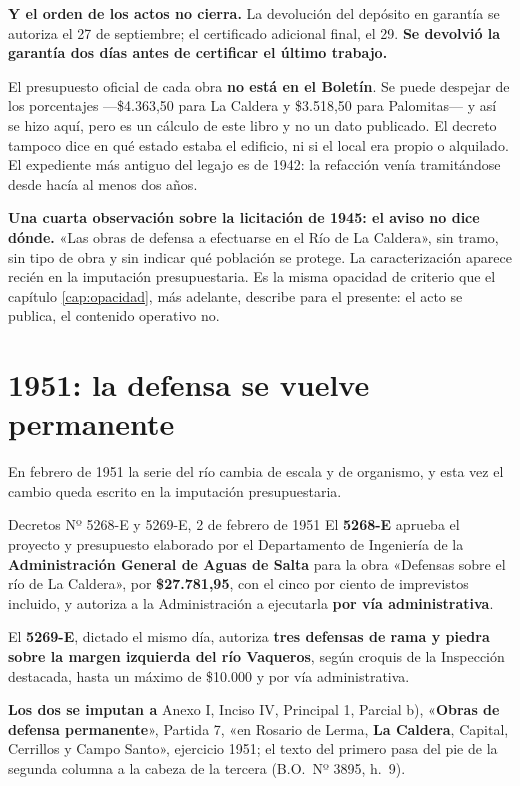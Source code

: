 \textbf{Y el orden de los actos no cierra.} La devolución del depósito en garantía se autoriza
el 27 de septiembre; el certificado adicional final, el 29. \textbf{Se devolvió la garantía dos
días antes de certificar el último trabajo.}

\begin{cautela}
El presupuesto oficial de cada obra \textbf{no está en el Boletín}. Se puede despejar de los
porcentajes ---\$4.363,50 para La Caldera y \$3.518,50 para Palomitas--- y así se hizo aquí, pero
es un cálculo de este libro y no un dato publicado. El decreto tampoco dice en qué estado
estaba el edificio, ni si el local era propio o alquilado. El expediente más antiguo del legajo
es de 1942: la refacción venía tramitándose desde hacía al menos dos años.
\end{cautela}

\textbf{Una cuarta observación sobre la licitación de 1945: el aviso no dice dónde.} «Las obras de defensa a efectuarse en el Río de La
Caldera», sin tramo, sin tipo de obra y sin indicar qué población se protege. La
caracterización aparece recién en la imputación presupuestaria. Es la misma opacidad de
criterio que el capítulo \ref{cap:opacidad}, más adelante, describe para el presente: el acto se publica, el contenido
operativo no.

\section{1951: la defensa se vuelve permanente}

En febrero de 1951 la serie del río cambia de escala y de organismo, y esta vez el cambio
queda escrito en la imputación presupuestaria.

\begin{ficha}{Decretos Nº 5268-E y 5269-E, 2 de febrero de 1951}
El \textbf{5268-E} aprueba el proyecto y presupuesto elaborado por el Departamento de
Ingeniería de la \textbf{Administración General de Aguas de Salta} para la obra «Defensas
sobre el río de La Caldera», por \textbf{\$27.781,95}, con el cinco por ciento de imprevistos
incluido, y autoriza a la Administración a ejecutarla \textbf{por vía administrativa}.

El \textbf{5269-E}, dictado el mismo día, autoriza \textbf{tres defensas de rama y piedra sobre
la margen izquierda del río Vaqueros}, según croquis de la Inspección destacada, hasta un
máximo de \$10.000 y por vía administrativa.

\textbf{Los dos se imputan a} Anexo I, Inciso IV, Principal 1, Parcial b),
«\textbf{Obras de defensa permanente}», Partida 7, «en Rosario de Lerma, \textbf{La Caldera},
Capital, Cerrillos y Campo Santo», ejercicio 1951; el texto del primero pasa del pie de la segunda columna a la cabeza de la tercera (B.O.\ Nº 3895, h.\ 9).
\end{ficha}

